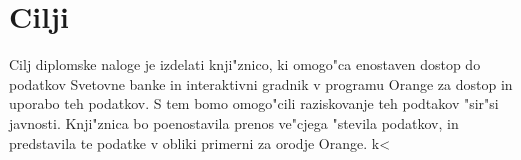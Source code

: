 \section{Cilji}

Cilj diplomske naloge je izdelati knji"znico, ki omogo"ca enostaven dostop do
podatkov Svetovne banke in interaktivni gradnik v programu Orange za dostop in
uporabo teh podatkov. S tem bomo omogo"cili raziskovanje teh podtakov "sir"si
javnosti. Knji"znica bo poenostavila prenos ve"cjega "stevila podatkov, in
predstavila te podatke v obliki primerni za orodje Orange. k<
